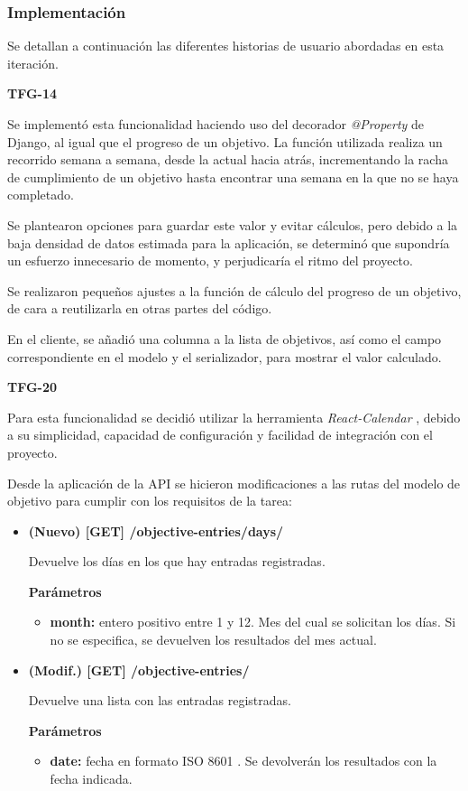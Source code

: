 \documentclass[10pt, a4paper]{aqademic}
\begin{document}
\subsubsection{Implementación}

Se detallan a continuación las diferentes historias de usuario abordadas en esta iteración.

\textbf{TFG-14}

Se implementó esta funcionalidad haciendo uso del decorador \textit{@Property} de Django, al igual que el progreso de un objetivo. La función utilizada realiza un recorrido semana a semana, desde la actual hacia atrás, incrementando la racha de cumplimiento de un objetivo hasta encontrar una semana en la que no se haya completado.

Se plantearon opciones para guardar este valor y evitar cálculos, pero debido a la baja densidad de datos estimada para la aplicación, se determinó que supondría un esfuerzo innecesario de momento, y perjudicaría el ritmo del proyecto.

Se realizaron pequeños ajustes a la función de cálculo del progreso de un objetivo, de cara a reutilizarla en otras partes del código.

En el cliente, se añadió una columna a la lista de objetivos, así como el campo correspondiente en el modelo y el serializador, para mostrar el valor calculado.

\medskip

\textbf{TFG-20}

Para esta funcionalidad se decidió utilizar la herramienta \textit{React-Calendar} \cite{maj__react-calendar_nodate}, debido a su simplicidad, capacidad de configuración y facilidad de integración con el proyecto. 

Desde la aplicación de la API se hicieron modificaciones a las rutas del modelo de objetivo para cumplir con los requisitos de la tarea:

\begin{itemize}
	\item \textbf{(Nuevo) [GET] /objective-entries/days/} 
	
	Devuelve los días en los que hay entradas registradas.
	
	\textbf{Parámetros}
	
	\begin{itemize}
		\item \textbf{month:} entero positivo entre 1 y 12. Mes del cual se solicitan los días. Si no se especifica, se devuelven los resultados del mes actual.
	\end{itemize}

	\item \textbf{(Modif.) [GET] /objective-entries/} 
	
	Devuelve una lista con las entradas registradas.

	\textbf{Parámetros}
	
	\begin{itemize}
		\item \textbf{date:} fecha en formato ISO 8601 \cite{houston1993iso}. Se devolverán los resultados con la fecha indicada.
	\end{itemize}
\end{itemize}
\end{document}
